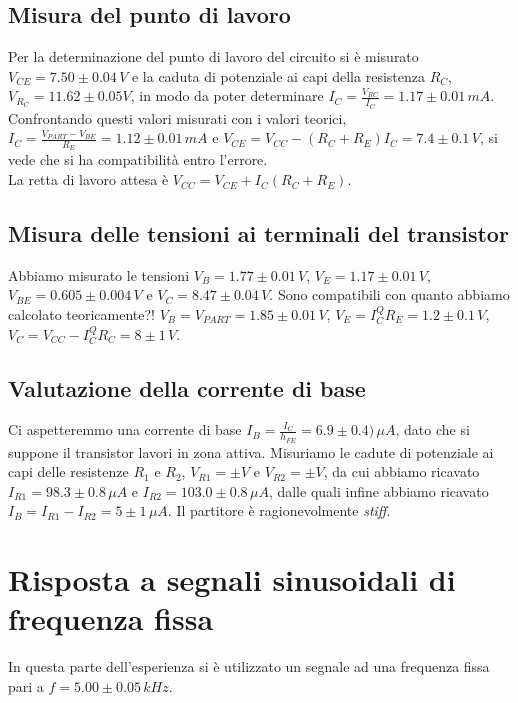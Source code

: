 \documentclass[10pt,a4paper]{article}
\begin{document}
\subsection{Misura del punto di lavoro}
Per la determinazione del punto di lavoro del circuito si è misurato $V_{CE}= 7.50\pm0.04 \, V$ e la caduta di potenziale ai capi della resistenza $R_C$, $V_{R_C}= 11.62\pm0.05  V$, in modo da poter determinare $I_C=\frac{V_{RC}}{I_C} = 1.17\pm0.01\,mA$.
Confrontando questi valori misurati con i valori teorici, $I_C=\frac{V_{PART}-V_{BE}}{R_E}= 1.12\pm0.01\,mA$ e $V_{CE}=V_{CC}-(R_C+R_E)I_C= 7.4\pm0.1\,V$, si vede che si ha compatibilità entro l'errore.\\
La retta di lavoro attesa è  $V_{CC}=V_{CE}+I_C(R_C+R_E)$.


\subsection{Misura delle tensioni ai terminali del transistor}
Abbiamo misurato le tensioni $V_B= 1.77\pm0.01\,V$, $V_E= 1.17\pm0.01\,V$, $V_{BE}= 0.605\pm0.004\,V$ e $V_C= 8.47\pm0.04\,V$. Sono compatibili con quanto abbiamo calcolato teoricamente?! $V_B= V_{PART}=1.85 \pm 0.01\,V$, $V_E=I_C^Q R_E = 1.2 \pm 0.1 \,V$, $V_C=V_{CC}-I_C^Q R_C = 8 \pm 1 \, V$.


\subsection{Valutazione della corrente di base}
Ci aspetteremmo una corrente di base $I_B=\frac{I_C}{h_{FE}} = 6.9 \pm 0.4) \, \mu A$, dato che si suppone il transistor lavori in zona attiva. Misuriamo le cadute di potenziale ai capi delle resistenze $R_1$ e $R_2$, $V_{R1}= \pm V$ e $V_{R2}= \pm V$, da cui abbiamo ricavato $I_{R1} = 98.3\pm0.8 \, \mu A$ e $I_{R2} = 103.0\pm0.8 \, \mu A$, dalle quali infine abbiamo ricavato $I_B=I_{R1}-I_{R2}= 5\pm1 \,\mu A$. Il partitore è ragionevolmente \emph{stiff}.

\section{Risposta a segnali sinusoidali di frequenza fissa}
In questa parte dell'esperienza si è utilizzato un segnale ad una frequenza fissa pari a $f= 5.00\pm0.05 \, kHz$.
\end{document}
